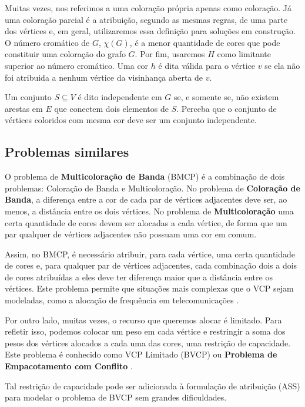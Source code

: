 \documentclass[11pt]{article}
\begin{document}
Muitas vezes, nos referimos a uma coloração própria apenas como coloração.
Já uma coloração parcial é a atribuição, segundo as mesmas regras, de uma parte dos vértices e, em geral, utilizaremos essa definição para soluções em construção.
O número cromático de \(G\),  \(\chi(G)\), é a menor quantidade de cores que pode constituir uma coloração do grafo \(G\).
Por fim, usaremos \(H\) como limitante superior ao número cromático.
Uma cor \(h\) é dita válida para o vértice \(v\) se ela não foi atribuida a nenhum vértice da visinhança aberta de \(v\).

Um conjunto \(S \subseteq V\) é dito independente em \(G\) se, e somente se, não existem arestas em \(E\) que conectem dois elementos de \(S\).
Perceba que o conjunto de vértices coloridos com mesma cor deve ser um conjunto independente.

\subsection{Problemas similares}
\label{sec:org93a7c96}
O problema de \textbf{Multicoloração de Banda} (BMCP) é a combinação de dois problemas: Coloração de Banda e Multicoloração.
No problema de \textbf{Coloração de Banda}, a diferença entre a cor de cada par de vértices adjacentes deve ser, ao menos, a distância entre os dois vértices.
No problema de \textbf{Multicoloração} uma certa quantidade de cores devem ser alocadas a cada vértice, de forma que um par qualquer de vértices adjacentes não possuam uma cor em comum.

Assim, no BMCP, é necessário atribuir, para cada vértice, uma certa quantidade de cores e, para qualquer par de vértices adjacentes, cada combinação dois a dois de cores atribuídas a eles deve ter diferença maior que a distância entre os vértices.
Este problema permite que situações mais complexas que o VCP sejam modeladas, como a alocação de frequência em telecomunicações \autocite{Aardal2007Modelssolutiontechniques}.

Por outro lado, muitas vezes, o recurso que queremos alocar é limitado.
Para refletir isso, podemos colocar um peso em cada vértice e restringir a soma dos pesos dos vértices alocados a cada uma das cores, uma restrição de capacidade.
Este problema é conhecido como VCP Limitado (BVCP) ou \textbf{Problema de Empacotamento com Conflito} \autocite{Connolly1991KnapsackProblemsAlgorithms}.

Tal restrição de capacidade pode ser adicionada à formulação de atribuição (ASS) para modelar o problema de BVCP sem grandes dificuldades.
\end{document}
